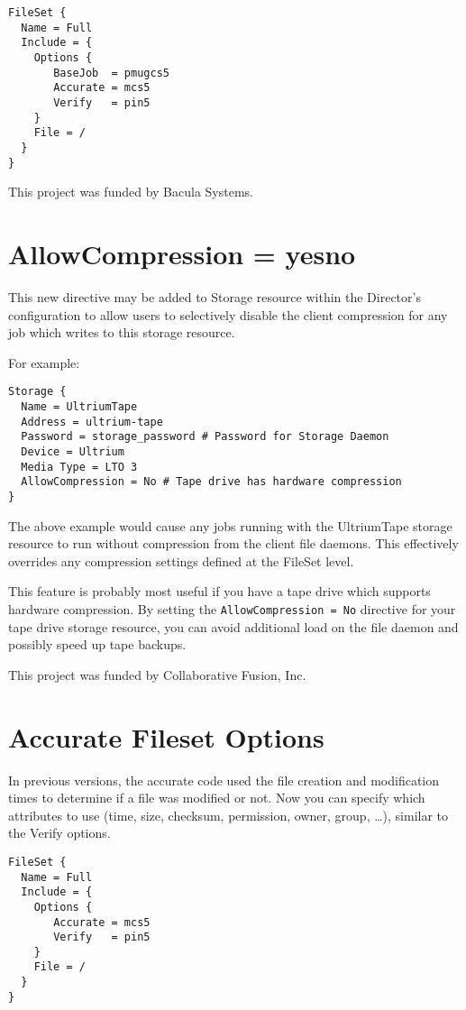 \begin{verbatim}
FileSet {
  Name = Full
  Include = {
    Options {
       BaseJob  = pmugcs5
       Accurate = mcs5
       Verify   = pin5
    }
    File = /
  }
}
\end{verbatim}


This project was funded by Bacula Systems.

\section{AllowCompression = \lt{}yes\vb{}no\gt{}}

This new directive may be added to Storage resource within the Director's
configuration to allow users to selectively disable the client compression for
any job which writes to this storage resource.

For example:
\begin{verbatim}
Storage {
  Name = UltriumTape
  Address = ultrium-tape
  Password = storage_password # Password for Storage Daemon
  Device = Ultrium
  Media Type = LTO 3
  AllowCompression = No # Tape drive has hardware compression
}
\end{verbatim}
The above example would cause any jobs running with the UltriumTape storage
resource to run without compression from the client file daemons.  This
effectively overrides any compression settings defined at the FileSet level.

This feature is probably most useful if you have a tape drive which supports
hardware compression.  By setting the \texttt{AllowCompression = No} directive
for your tape drive storage resource, you can avoid additional load on the file
daemon and possibly speed up tape backups.

This project was funded by Collaborative Fusion, Inc.

\section{Accurate Fileset Options}
\label{sec:accuratefileset}

In previous versions, the accurate code used the file creation and modification
times to determine if a file was modified or not. Now you can specify which
attributes to use (time, size, checksum, permission, owner, group, \dots),
similar to the Verify options.

\begin{verbatim}
FileSet {
  Name = Full
  Include = {
    Options {
       Accurate = mcs5
       Verify   = pin5
    }
    File = /
  }
}
\end{verbatim}

